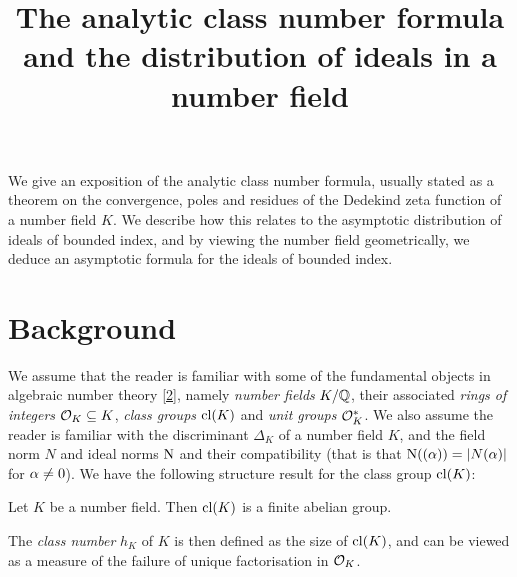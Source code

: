 \documentclass[11pt]{report}
\title{The analytic class number formula and the distribution of ideals in a number field}
\begin{document}
\maketitle
\abstract

We give an exposition of the analytic class number formula, usually stated as a theorem on the convergence, poles and residues of the Dedekind zeta function of a number field $K$. We describe how this relates to the asymptotic distribution of ideals of bounded index, and by viewing the number field geometrically, we deduce an asymptotic formula for the ideals of bounded index.

\tableofcontents
\chapter{Background} %
We assume that the reader is familiar with some of the fundamental objects in algebraic number theory \hyperlink{stevenhagen}{[2]}, namely \emph{number fields} $K / \mathbb{Q}$, their associated \emph{rings of integers} $\mathcal{O}_K \subseteq K$, \emph{class groups} $\operatorname{cl}(K)$ and \emph{unit groups} $\mathcal{O}_K^*$. We also assume the reader is familiar with the discriminant $\Delta_K$ of a number field $K$, and the field norm $N$ and ideal norms $\operatorname{N}$ and their compatibility (that is that $\operatorname{N}((\alpha)) = \left| N(\alpha) \right|$ for $\alpha \neq 0$). We have the following structure result for the class group $\operatorname{cl}(K)$:
\begin{theorem}
    Let $K$ be a number field. Then $\operatorname{cl}(K)$ is a finite abelian group.
\end{theorem}
The \emph{class number} $h_K$ of $K$ is then defined as the size of $\operatorname{cl}(K)$, and can be viewed as a measure of the failure of unique factorisation in $\mathcal{O}_K$.
\end{document}
